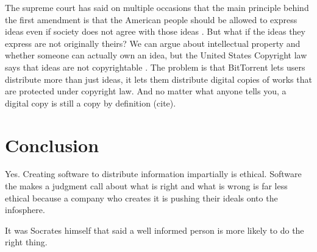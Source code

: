 \documentclass[11pt]{article}
\begin{document}
\begin{multicols}{2}
The supreme court has said on multiple occasions that the main principle behind the first amendment is that the American people should be allowed to express ideas even if society does not agree with those ideas \cite[51]{1988hustler}. But what if the ideas they express are not originally theirs? We can argue about intellectual property and whether someone can actually own an idea, but the United States Copyright law says that ideas are not copyrightable \cite{t17c1s103}. The problem is that BitTorrent lets users distribute more than just ideas, it lets them distribute digital copies of works that are protected under copyright law. And no matter what anyone tells you, a digital copy is still a copy by definition (cite).

\section{Conclusion}
Yes. Creating software to distribute information impartially is ethical. Software the makes a judgment call about what is right and what is wrong is far less ethical because a company who creates it is pushing their ideals onto the infosphere.

It was Socrates himself that said a well informed person is more likely to do the right thing.

\end{multicols}

\newpage
\singlespacing


\end{document}
